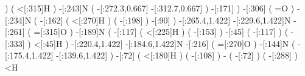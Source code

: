                           )
                          (
                    <[:315]H%
                          )
                -[:243]N%
                          (
            -[:272.3,0.667]%
            -[:312.7,0.667]\phantom{N}%
                          )
                -[:171]%
                      )
            -[:306]%
                      (
                      =O%
                      )
            -[:234]N%
                      (
                -[:162]%
                          (
                    <[:270]H%
                          )
                          (
                    -[:198]\phantom{N}%
                          )
                 -[:90]%
                      )
    -[:265.4,1.422]%
    -[:229.6,1.422]N%
            -[:261]%
                      (
                =[:315]O%
                      )
            -[:189]N%
                      (
                -[:117]%
                          (
                    <[:225]H%
                          )
                          (
                    -[:153]\phantom{N}%
                          )
                 -[:45]%
                          (
                    -[:117]\phantom{N}%
                          )
                          (
                    -[:333]\phantom{N}%
                          )
                 <[:45]H%
                      )
    -[:220.4,1.422]%
    -[:184.6,1.422]N%
            -[:216]%
                      (
                =[:270]O%
                      )
            -[:144]N%
                      (
        -[:175.4,1.422]%
        -[:139.6,1.422]\phantom{N}%
                      )
             -[:72]%
                      (
                <[:180]H%
                      )
                      (
                -[:108]\phantom{N}%
                      )
                  -%
                      (
                 -[:72]\phantom{N}%
                      )
                      (
                -[:288]\phantom{N}%
                      )
                  <H%